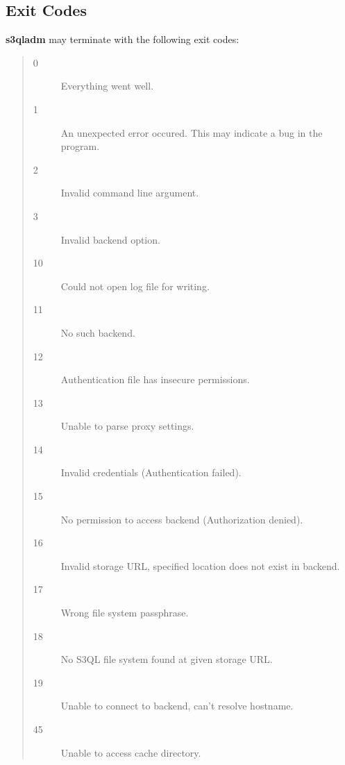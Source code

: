 \documentclass[letterpaper,10pt,english]{sphinxmanual}
\begin{document}
\subsection{Exit Codes}
\label{man/adm:exit-codes}
\textbf{s3qladm} may terminate with the following exit codes:
\begin{quote}\begin{description}
\item[{0}] \leavevmode
Everything went well.

\item[{1}] \leavevmode
An unexpected error occured. This may indicate a bug in the
program.

\item[{2}] \leavevmode
Invalid command line argument.

\item[{3}] \leavevmode
Invalid backend option.

\item[{10}] \leavevmode
Could not open log file for writing.

\item[{11}] \leavevmode
No such backend.

\item[{12}] \leavevmode
Authentication file has insecure permissions.

\item[{13}] \leavevmode
Unable to parse proxy settings.

\item[{14}] \leavevmode
Invalid credentials (Authentication failed).

\item[{15}] \leavevmode
No permission to access backend (Authorization denied).

\item[{16}] \leavevmode
Invalid storage URL, specified location does not exist in backend.

\item[{17}] \leavevmode
Wrong file system passphrase.

\item[{18}] \leavevmode
No S3QL file system found at given storage URL.

\item[{19}] \leavevmode
Unable to connect to backend, can't resolve hostname.

\item[{45}] \leavevmode
Unable to access cache directory.

\end{description}\end{quote}
\end{document}

